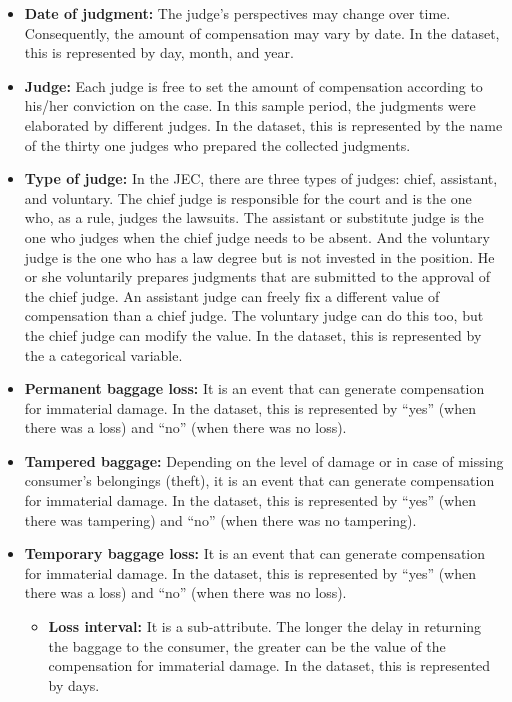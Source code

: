 \begin{itemize}[topsep=1em,leftmargin=1.5\parindent,align=left,labelwidth=0.5\parindent, noitemsep]
  \item \textbf{Date of judgment:} The judge's perspectives may change over time. Consequently, the amount of compensation may vary by date. In the dataset, this is represented by day, month, and year.
  \item \textbf{Judge:} Each judge is free to set the amount of compensation according to his/her conviction on the case. In this sample period, the judgments were elaborated by different judges. In the dataset, this is represented by the name of the thirty one judges who prepared the collected judgments.
  \item \textbf{Type of judge:} In the \gls{JEC}, there are three types of judges: chief, assistant, and voluntary. The chief judge is responsible for the court and is the one who, as a rule, judges the lawsuits. The assistant or substitute judge is the one who judges when the chief judge needs to be absent. And the voluntary judge is the one who has a law degree but is not invested in the position. He or she voluntarily prepares judgments that are submitted to the approval of the chief judge. An assistant judge can freely fix a different value of compensation than a chief judge. The voluntary judge can do this too, but the chief judge can modify the value. In the dataset, this is represented by the a categorical variable. 
  \item \textbf{Permanent baggage loss:} It is an event that can generate compensation for immaterial damage. In the dataset, this is represented by ``yes'' (when there was a loss) and ``no'' (when there was no loss).
  \item \textbf{Tampered baggage:} Depending on the level of damage or in case of missing consumer's belongings (theft), it is an event that can generate compensation for immaterial damage. In the dataset, this is represented by ``yes'' (when there was tampering) and ``no'' (when there was no tampering). 
  \item\textbf{Temporary baggage loss:} It is an event that can generate compensation for immaterial damage. In the dataset, this is represented by ``yes'' (when there was a loss) and ``no'' (when there was no loss).
  \begin{itemize}[noitemsep]
    \item \textbf{Loss interval: }It is a sub-attribute. The longer the delay in returning the baggage to the consumer, the greater can be the value of the compensation for immaterial damage. In the dataset, this is represented by days.

\end{itemize}
\end{itemize}
